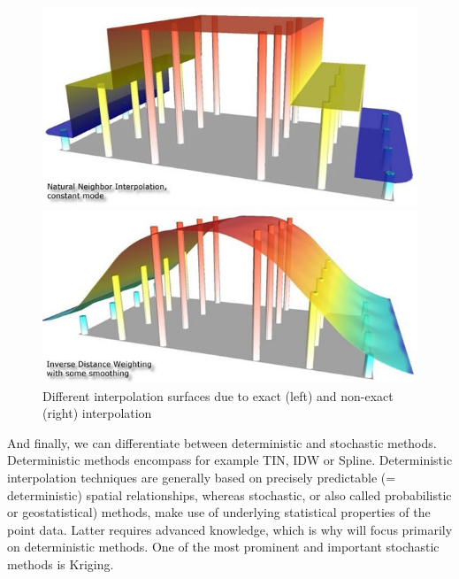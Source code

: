 \begin{figure}
	\begin{minipage}[b]{.48\linewidth}
		\includegraphics[width=\linewidth]{images/exakte_interpolation.jpg}
	\end{minipage}
	\hfill
	\begin{minipage}[b]{.48\linewidth}
		\includegraphics[width=\linewidth]{images/nicht_exakte_interpolation.jpg}
	\end{minipage}
	\label{fig:exact_non_exact_interploation}
	\caption{Different interpolation surfaces due to exact (left) and non-exact (right) interpolation\cite{gitta_raumliche_2016}}
\end{figure}

And finally, we can differentiate between deterministic and stochastic methods.\cite{gitta_raumliche_2016}
Deterministic methods encompass for example \ldq{}TIN\rdq{}, \ldq{}IDW\rdq{} or \ldq{}Spline\rdq{}. \cite{wasser_going_2020} Deterministic interpolation techniques are generally based on precisely predictable (= deterministic) spatial relationships, whereas stochastic, or also called probabilistic or geostatistical) methods, make use of underlying statistical properties of the point data. Latter requires advanced knowledge, which is why will focus primarily on deterministic methods. One of the most prominent and important stochastic methods is Kriging.

